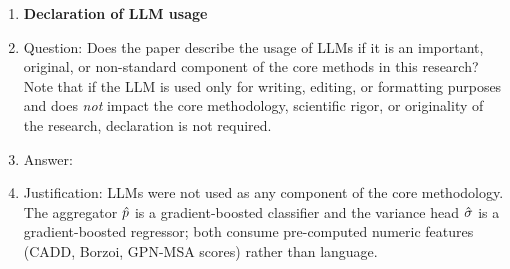 \begin{enumerate}
\item {\bf Declaration of LLM usage}
    \item[] Question: Does the paper describe the usage of LLMs if it is an important, original, or non-standard component of the core methods in this research? Note that if the LLM is used only for writing, editing, or formatting purposes and does \emph{not} impact the core methodology, scientific rigor, or originality of the research, declaration is not required.
    \item[] Answer: \answerNA{}
    \item[] Justification: LLMs were not used as any component of the core methodology. The aggregator $\hat{p}$ is a gradient-boosted classifier and the variance head $\hat{\sigma}$ is a gradient-boosted regressor; both consume pre-computed numeric features (CADD, Borzoi, GPN-MSA scores) rather than language.

\end{enumerate}
